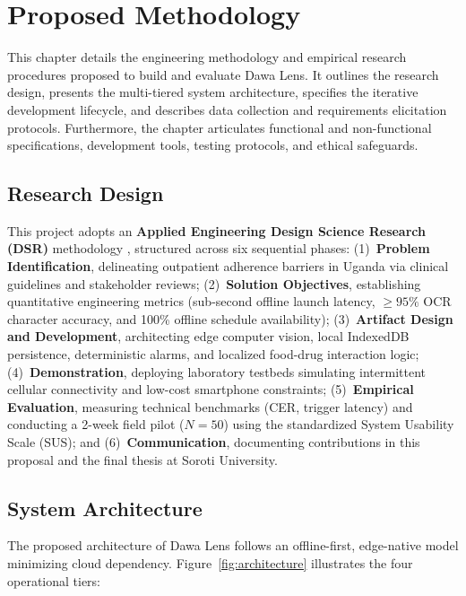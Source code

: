 \chapter{Proposed Methodology}
\label{ch:methodology}

This chapter details the engineering methodology and empirical research procedures proposed to build and evaluate Dawa Lens. It outlines the research design, presents the multi-tiered system architecture, specifies the iterative development lifecycle, and describes data collection and requirements elicitation protocols. Furthermore, the chapter articulates functional and non-functional specifications, development tools, testing protocols, and ethical safeguards.

\section{Research Design}

This project adopts an \textbf{Applied Engineering Design Science Research (DSR)} methodology \cite{hevner2004design}, structured across six sequential phases: (1)~\textbf{Problem Identification}, delineating outpatient adherence barriers in Uganda via clinical guidelines and stakeholder reviews; (2)~\textbf{Solution Objectives}, establishing quantitative engineering metrics (sub-second offline launch latency, $\ge 95\%$ OCR character accuracy, and 100\% offline schedule availability); (3)~\textbf{Artifact Design and Development}, architecting edge computer vision, local IndexedDB persistence, deterministic alarms, and localized food-drug interaction logic; (4)~\textbf{Demonstration}, deploying laboratory testbeds simulating intermittent cellular connectivity and low-cost smartphone constraints; (5)~\textbf{Empirical Evaluation}, measuring technical benchmarks (CER, trigger latency) and conducting a 2-week field pilot ($N=50$) using the standardized System Usability Scale (SUS); and (6)~\textbf{Communication}, documenting contributions in this proposal and the final thesis at Soroti University.

\section{System Architecture}
\label{sec:architecture}

The proposed architecture of Dawa Lens follows an offline-first, edge-native model minimizing cloud dependency. Figure~\ref{fig:architecture} illustrates the four operational tiers:

